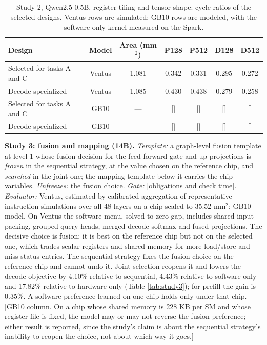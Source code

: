 \documentclass[11pt]{article}
\newcommand{\pending}[1]{\textcolor{red!65!black}{[#1]}}
\begin{document}
\begin{table}[tb]
\small
\centering
\begin{tabular}{@{}L{0.26\textwidth}cccccc@{}}
\toprule
Design & Model & Area (mm\(^2\)) & P128 & P512 & D128 & D512 \\
\midrule
Selected for tasks A and C & Ventus & 1.081 & 0.342 & 0.331 & 0.295 & 0.272 \\
Decode-specialized & Ventus & 1.085 & 0.430 & 0.438 & 0.279 & 0.258 \\
Selected for tasks A and C & GB10 & --- & \pending{} & \pending{} & \pending{} & \pending{} \\
Decode-specialized & GB10 & --- & \pending{} & \pending{} & \pending{} & \pending{} \\
\bottomrule
\end{tabular}
\caption{Study 2, Qwen2.5-0.5B, register tiling and tensor shape: cycle ratios of the selected designs. Ventus rows are simulated; GB10 rows are modeled, with the software-only kernel measured on the Spark.}
\label{tab:study2}
\end{table}

\textbf{Study 3: fusion and mapping (14B).} \emph{Template:} a graph-level fusion template at level 1 whose fusion decision for the feed-forward gate and up projections is \emph{frozen} in the sequential strategy, at the value chosen on the reference chip, and \emph{searched} in the joint one; the mapping template below it carries the chip variables. \emph{Unfreezes:} the fusion choice. \emph{Gate:} \pending{obligations and check time}. \emph{Evaluator:} Ventus, estimated by calibrated aggregation of representative instruction simulations over all 48 layers on a chip scaled to 35.52 mm\(^2\); GB10 model. On Ventus the software menu, solved to zero gap, includes shared input packing, grouped query heads, merged decode softmax and fused projections. The decisive choice is fusion: it is best on the reference chip but not on the selected one, which trades scalar registers and shared memory for more load/store and miss-status entries. The sequential strategy fixes the fusion choice on the reference chip and cannot undo it. Joint selection reopens it and lowers the decode objective by 4.10\% relative to sequential, 4.43\% relative to software only and 17.82\% relative to hardware only (Table \ref{tab:study3}); for prefill the gain is 0.35\%. A software preference learned on one chip holds only under that chip. \pending{GB10 column. On a chip whose shared memory is 228 KB per SM and whose register file is fixed, the model may or may not reverse the fusion preference; either result is reported, since the study's claim is about the sequential strategy's inability to reopen the choice, not about which way it goes.}
\end{document}
